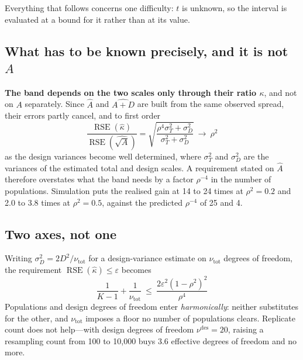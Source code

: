 Everything that follows concerns one difficulty: $t$ is unknown, so the interval
is evaluated at a bound for it rather than at its value.

\subsection{What has to be known precisely, and it is not $A$}

\textbf{The band depends on the two scales only through their ratio $\kappa$},
and not on $A$ separately. Since $\widehat A$ and $\widehat{A+D}$ are built from
the same observed spread, their errors partly cancel, and to first order
\begin{equation}\label{eq:elasticity_kappa}
\frac{\operatorname{RSE}(\widehat\kappa)}{\operatorname{RSE}(\widehat{\sqrt A})}
=\sqrt{\frac{\rho^4\sigma_T^2+\sigma_D^2}{\sigma_T^2+\sigma_D^2}}
\ \longrightarrow\ \rho^2
\end{equation}
as the design variances become well determined, where $\sigma_T^2$ and
$\sigma_D^2$ are the variances of the estimated total and design scales. A
requirement stated on $\widehat A$ therefore overstates what the band needs by a
factor $\rho^{-4}$ in the number of populations. Simulation puts the realised
gain at 14 to 24 times at $\rho^2=0.2$ and 2.0 to 3.8 times at $\rho^2=0.5$,
against the predicted $\rho^{-4}$ of 25 and 4.

\subsection{Two axes, not one}

Writing $\sigma_D^2=2D^2/\nu_{\mathrm{tot}}$ for a design-variance estimate on
$\nu_{\mathrm{tot}}$ degrees of freedom, the requirement
$\operatorname{RSE}(\widehat\kappa)\le\varepsilon$ becomes
\begin{equation}\label{eq:twoaxis}
\boxed{\ \frac{1}{K-1}+\frac{1}{\nu_{\mathrm{tot}}}\ \le\
\frac{2\varepsilon^2(1-\rho^2)^2}{\rho^4}\ }
\end{equation}
Populations and design degrees of freedom enter \emph{harmonically}: neither
substitutes for the other, and $\nu_{\mathrm{tot}}$ imposes a floor no number of
populations clears. Replicate count does not help---with design degrees of
freedom $\nu^{\mathrm{des}}=20$, raising a resampling count from 100 to 10{,}000
buys 3.6 effective degrees of freedom and no more.

